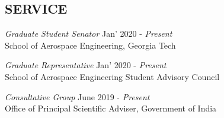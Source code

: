 \documentclass[margin, 10pt]{res} %
\begin{document}
\begin{resume}

%


\section{SERVICE}

{\sl Graduate Student Senator} \hfill Jan' 2020 - \emph{Present}\\
School of Aerospace Engineering, Georgia Tech

{\sl Graduate Representative} \hfill Jan' 2020 - \emph{Present}\\
School of Aerospace Engineering Student Advisory Council

{\sl Consultative Group} \hfill June 2019 - \emph{Present}\\
Office of Principal Scientific Adviser, Government of India


\end{resume}
\end{document}
